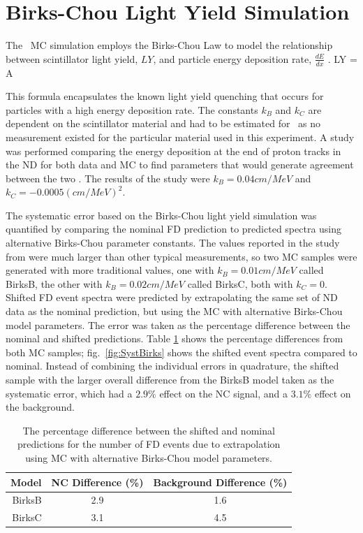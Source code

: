 \section{Birks-Chou Light Yield Simulation}

The \nova~MC simulation employs the Birks-Chou Law to model the relationship between scintillator light yield, $LY$, and particle energy deposition rate, $\frac{dE}{dx}$ \cite{ref:BirksChou}. 
\beq
LY = A  
\label{eq:BirksChou}
\eeq

\n This formula encapsulates the known light yield quenching that occurs for particles with a high energy deposition rate. The constants $k_B$ and $k_C$ are dependent on the scintillator material and had to be estimated for \nova~as no measurement existed for the particular material used in this experiment. A study was performed comparing the energy deposition at the end of proton tracks in the ND for both data and MC to find parameters that would generate agreement between the two \cite{ref:DanBirks}. The results of the study were $k_B = 0.04\unit{cm/MeV}$ and $k_C = -0.0005\unit{(cm/MeV)}^2$.

The systematic error based on the Birks-Chou light yield simulation was quantified by comparing the nominal FD prediction to predicted spectra using alternative Birks-Chou parameter constants. The values reported in the study from \cite{ref:DanBirks} were much larger than other typical measurements, so two MC samples were generated with more traditional values, one with $k_B = 0.01\unit{cm/MeV}$ called BirksB, the other with $k_B = 0.02\unit{cm/MeV}$ called BirksC, both with $k_C = 0$. Shifted FD event spectra were predicted by extrapolating the same set of ND data as the nominal prediction, but using the MC with alternative Birks-Chou model parameters. The error was taken as the percentage difference between the nominal and shifted predictions. Table \ref{tab:SystBirks} shows the percentage differences from both MC samples; fig.~\ref{fig:SystBirks} shows the shifted event spectra compared to nominal. Instead of combining the individual errors in quadrature, the shifted sample with the larger overall difference from the BirksB model taken as the systematic error, which had a $2.9\%$ effect on the NC signal, and a $3.1\%$ effect on the background.
\begin{table}[h]
  \begin{center}
    \caption[Birks-Chou Systematic Errors]{The percentage difference between the shifted and nominal predictions for the number of FD events due to extrapolation using MC with alternative Birks-Chou model parameters.}
    \label{tab:SystBirks}
    \begin{tabular}{r c c}
      \hline\hline
      Model & NC Difference (\%) & Background Difference (\%) \\
      \hline
      BirksB & 2.9 & 1.6 \\
      BirksC & 3.1 & 4.5 \\
      \hline
    \end{tabular}
  \end{center}
\end{table}


